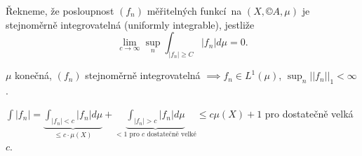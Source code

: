 \documentclass[12pt]{article}					%
\begin{document}

\begin{definice}
	Řekneme, že posloupnost $(f_n)$ měřitelných funkcí na $(X, ©A, \mu)$ je stejnoměrně integrovatelná (uniformly integrable), jestliže
	$$ \lim_{c \rightarrow ∞} \sup_n \int_{|f_n| ≥ C} |f_n| d\mu = 0. $$
\end{definice}

\begin{tvrzeni}
	$\mu$ konečná, $(f_n)$ stejnoměrně integrovatelná $\implies f_n \in L^1(\mu)$, $\sup_n ||f_n||_1 < ∞$.

	\begin{dukazin}
		$\int |f_n| = \underbrace{\int_{|f_n| < c} |f_n| d\mu}_{≤ c · \mu(X)} + \underbrace{\int_{|f_n| > c} |f_n| d\mu}_{<1\text{ pro $c$ dostatečně velké}} ≤ c \mu(X) + 1$ pro dostatečně velká $c$.
	\end{dukazin}
\end{tvrzeni}
\end{document}
